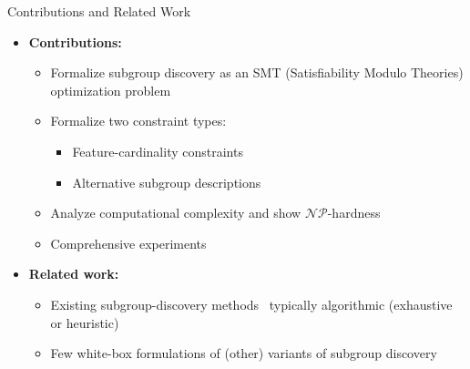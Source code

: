 \documentclass[en, navbaroff, handout]{sdqbeamer}
\begin{document}
\begin{frame}[t]{Contributions and Related Work}
	\begin{itemize}
		\item \textbf{Contributions:}
		\begin{itemize}
			\item Formalize subgroup discovery as an SMT (Satisfiability Modulo Theories) optimization problem
			\item Formalize two constraint types:
			\begin{itemize}
				\item Feature-cardinality constraints
				\item Alternative subgroup descriptions
			\end{itemize}
			\item Analyze computational complexity and show $\mathcal{NP}$-hardness
			\item Comprehensive experiments
		\end{itemize}
		\pause
		\vspace{\baselineskip}
		\item \textbf{Related work:}
		\begin{itemize}
			\item Existing subgroup-discovery methods~\cite{atzmueller2015subgroup, helal2016subgroup, herrera2011overview, ventura2018subgroup} typically algorithmic (exhaustive or heuristic)
			\item Few white-box formulations of (other) variants of subgroup discovery~\cite{bonates2008maximum, eckstein2002maximum, guns2011itemset, koccak2020exploiting, louveaux2014combinatorial}

\end{itemize}
\end{itemize}
\end{frame}
\end{document}

